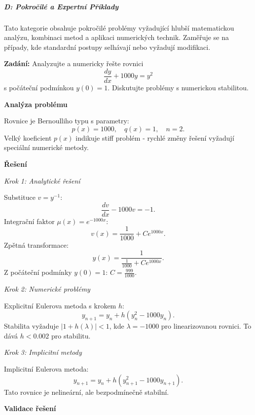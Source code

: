 \subparagraph*{D: Pokročilé a Expertní Příklady}
\label{subpar:d-pokrocile-priklady}

Tato kategorie obsahuje pokročilé problémy vyžadující hlubší matematickou analýzu, 
kombinaci metod a aplikaci numerických technik. Zaměřuje se na případy, kde standardní 
postupy selhávají nebo vyžadují modifikaci.

\vspace{1\baselineskip}

\begin{example}
\label{ex:d1-stiff-problemy}

\noindent\textbf{Zadání:} Analyzujte a numericky řešte rovnici
\[
\frac{dy}{dx} + 1000y = y^2
\]
s počáteční podmínkou $y(0) = 1$. Diskutujte problémy s numerickou stabilitou.

\vspace{1.5\baselineskip}

\noindent\textbf{Analýza problému}

\noindent Rovnice je Bernoulliho typu s parametry:
\[
p(x) = 1000, \quad q(x) = 1, \quad n = 2.
\]
Velký koeficient $p(x)$ indikuje stiff problém - rychlé změny řešení vyžadují 
speciální numerické metody.

\vspace{1.5\baselineskip}

\noindent\textbf{Řešení}

\noindent\textit{Krok 1: Analytické řešení}

Substituce $v = y^{-1}$:
\[
\frac{dv}{dx} - 1000v = -1.
\]
Integrační faktor $\mu(x) = e^{-1000x}$:
\[
v(x) = \frac{1}{1000} + Ce^{1000x}.
\]
Zpětná transformace:
\[
y(x) = \frac{1}{\frac{1}{1000} + Ce^{1000x}}. \tag{1}
\]
Z počáteční podmínky $y(0) = 1$: $C = \frac{999}{1000}$.

\noindent\textit{Krok 2: Numerické problémy}

Explicitní Eulerova metoda s krokem $h$:
\[
y_{n+1} = y_n + h(y_n^2 - 1000y_n).
\]
Stabilita vyžaduje $|1 + h(\lambda)| < 1$, kde $\lambda = -1000$ pro linearizovanou rovnici.
To dává $h < 0.002$ pro stabilitu.

\noindent\textit{Krok 3: Implicitní metody}

Implicitní Eulerova metoda:
\[
y_{n+1} = y_n + h(y_{n+1}^2 - 1000y_{n+1}).
\]
Tato rovnice je nelineární, ale bezpodmínečně stabilní.

\vspace{1.5\baselineskip}

\noindent\textbf{Validace řešení}


\end{example}
